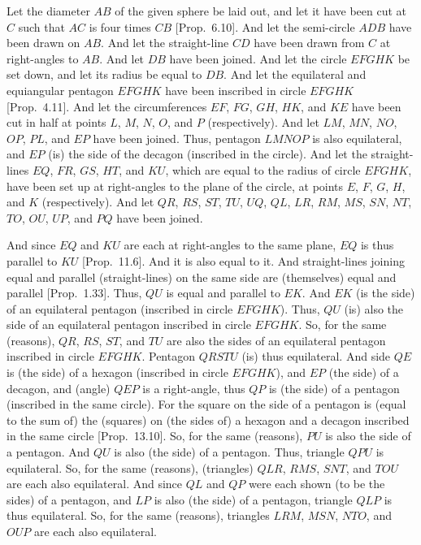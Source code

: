 \epsfysize=1.5in
\centerline{}

Let the diameter $AB$ of the given sphere be laid out, and let it have been
cut at $C$ such that $AC$ is four times $CB$ [Prop.~6.10]. And
let the semi-circle $ADB$ have been drawn on $AB$. And let the straight-line $CD$ have been drawn from $C$ at right-angles to $AB$. And let
$DB$ have been joined. And let the circle $EFGHK$ be set down,
and let its radius be equal to $DB$.  And let the equilateral and
equiangular pentagon $EFGHK$ have been inscribed in circle
$EFGHK$ [Prop.~4.11]. And let the circumferences $EF$, $FG$,
$GH$, $HK$, and $KE$ have been cut in half at points $L$, $M$,
$N$, $O$, and $P$ (respectively). And let $LM$, $MN$, $NO$,
$OP$, $PL$, and $EP$ have been joined. Thus, pentagon $LMNOP$
is also equilateral, and $EP$ (is) the side of the decagon (inscribed in the circle).
And let the straight-lines $EQ$, $FR$, $GS$, $HT$, and $KU$, which
are equal to the radius of circle $EFGHK$,  have
been set up at right-angles to the plane of the circle, at points $E$, $F$, $G$, $H$, and $K$ (respectively). And let $QR$, $RS$, $ST$, $TU$,
$UQ$, $QL$, $LR$, $RM$, $MS$, $SN$, $NT$, $TO$,
$OU$, $UP$, and $PQ$ have been joined.

And since $EQ$ and $KU$ are each at right-angles to the same plane, $EQ$ is thus parallel to $KU$ [Prop.~11.6]. And it is also equal to it. And straight-lines joining equal and parallel (straight-lines) on the same side are
(themselves) equal and parallel [Prop.~1.33]. Thus, $QU$
is equal and parallel to $EK$. And $EK$ (is the side) of an equilateral
pentagon (inscribed in circle $EFGHK$). Thus, $QU$ (is) also  the
side of an equilateral pentagon inscribed in circle $EFGHK$.  So, for the
same (reasons), $QR$, $RS$, $ST$, and $TU$ are also  the sides of
an equilateral pentagon inscribed in circle $EFGHK$. Pentagon
$QRSTU$ (is) thus equilateral. And side $QE$
is (the side) of a hexagon (inscribed in circle $EFGHK$),
and $EP$ (the side) of a decagon, and (angle) $QEP$ is a right-angle, 
thus $QP$ is  (the side) of a pentagon (inscribed in the same circle).
For the square on the side of a pentagon is (equal to the sum of)
the (squares) on (the sides of) a hexagon and a decagon inscribed in the
same circle  [Prop.~13.10]. So, for the same (reasons), $PU$
is also the side of a pentagon. And $QU$ is also (the
side) of a pentagon. Thus, triangle $QPU$ is equilateral. So, for the
same (reasons), (triangles) $QLR$, $RMS$, $SNT$, and $TOU$
are each also equilateral. And since $QL$ and $QP$ were each shown
(to be the sides) of a pentagon,  and $LP$ is  also (the side) of a pentagon, triangle $QLP$ is thus equilateral. So,
for the same (reasons), triangles $LRM$, $MSN$, $NTO$, and
$OUP$ are each also equilateral. 

